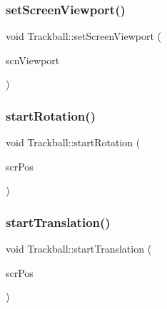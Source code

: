 \mbox{\label{class_trackball_aac926ad4f5144195a88b47203e3b5ca7}} 
\subsubsection{\texorpdfstring{set\+Screen\+Viewport()}{setScreenViewport()}}
{\footnotesize\ttfamily void Trackball\+::set\+Screen\+Viewport (\begin{DoxyParamCaption}\item[{const Eigen\+::\+Aligned\+Box2f \&}]{scn\+Viewport }\end{DoxyParamCaption})}

\mbox{\label{class_trackball_afa938da0cd322cc44cfb9e73add017df}} 
\subsubsection{\texorpdfstring{start\+Rotation()}{startRotation()}}
{\footnotesize\ttfamily void Trackball\+::start\+Rotation (\begin{DoxyParamCaption}\item[{const Eigen\+::\+Vector2f \&}]{scr\+Pos }\end{DoxyParamCaption})}

\mbox{\label{class_trackball_afd0be3e6f9c79903d35af33fb2a6451c}} 
\subsubsection{\texorpdfstring{start\+Translation()}{startTranslation()}}
{\footnotesize\ttfamily void Trackball\+::start\+Translation (\begin{DoxyParamCaption}\item[{const Eigen\+::\+Vector2f \&}]{scr\+Pos }\end{DoxyParamCaption})}

\mbox{\label{class_trackball_af8dc66630b00cd3d92b999630691ff05}} 

